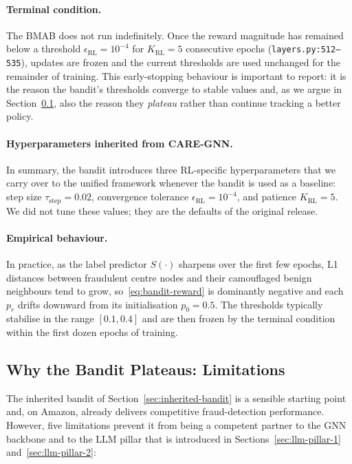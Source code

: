 \paragraph{Terminal condition.} The BMAB does not run indefinitely. Once the reward magnitude has remained below a threshold $\epsilon_{\text{RL}} = 10^{-4}$ for $K_{\text{RL}} = 5$ consecutive epochs (\texttt{layers.py:512--535}), updates are frozen and the current thresholds are used unchanged for the remainder of training. This early-stopping behaviour is important to report: it is the reason the bandit's thresholds converge to stable values and, as we argue in Section~\ref{sec:bandit-limitations}, also the reason they \emph{plateau} rather than continue tracking a better policy.

\paragraph{Hyperparameters inherited from CARE-GNN.} In summary, the bandit introduces three RL-specific hyperparameters that we carry over to the unified framework whenever the bandit is used as a baseline: step size $\tau_{\text{step}} = 0.02$, convergence tolerance $\epsilon_{\text{RL}} = 10^{-4}$, and patience $K_{\text{RL}} = 5$. We did not tune these values; they are the defaults of the original release.

\paragraph{Empirical behaviour.} In practice, as the label predictor $S(\cdot)$ sharpens over the first few epochs, L1 distances between fraudulent centre nodes and their camouflaged benign neighbours tend to grow, so~\eqref{eq:bandit-reward} is dominantly negative and each $p_r$ drifts downward from its initialisation $p_0 = 0.5$. The thresholds typically stabilise in the range $[0.1, 0.4]$ and are then frozen by the terminal condition within the first dozen epochs of training.

\subsection{Why the Bandit Plateaus: Limitations}
\label{sec:bandit-limitations}

The inherited bandit of Section~\ref{sec:inherited-bandit} is a sensible starting point and, on Amazon, already delivers competitive fraud-detection performance. However, five limitations prevent it from being a competent partner to the GNN backbone and to the LLM pillar that is introduced in Sections~\ref{sec:llm-pillar-1} and~\ref{sec:llm-pillar-2}:

